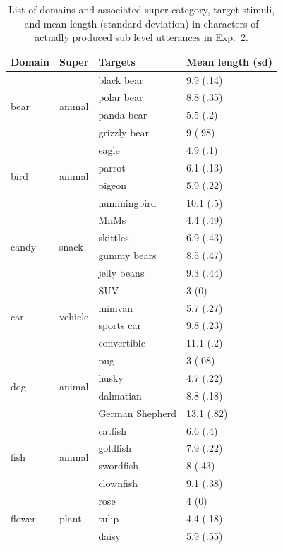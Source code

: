 \documentclass[11pt]{article}
\begin{document}
\begin{table}
\centering
\caption{List of domains and associated super category, target stimuli, and mean length (standard deviation) in characters of actually produced sub level utterances in Exp.~2.}
	\label{tab:reflevelstimuli}
	\begin{tabular}{l l l l}
	\toprule
	Domain & Super & Targets & Mean length (sd)\\
	\midrule
	\multirow{4}{*}{bear} & \multirow{4}{*}{animal} & black bear & 9.9 (.14)\\
	& & polar bear & 8.8 (.35)\\
	& & panda bear & 5.5 (.2)\\
	& & grizzly bear & 9 (.98)\\
	\midrule
	\multirow{4}{*}{bird} & \multirow{4}{*}{animal} & eagle & 4.9 (.1)\\
	& 	& parrot & 6.1 (.13)\\
	& & pigeon & 5.9 (.22)\\
	& 	& hummingbird & 10.1 (.5)\\
	\midrule
	\multirow{4}{*}{candy} & \multirow{4}{*}{snack} & MnMs & 4.4 (.49)\\
		& & skittles & 6.9 (.43)\\
		& & gummy bears & 8.5 (.47)\\
		& & jelly beans & 9.3 (.44)\\
	\midrule
	\multirow{4}{*}{car} & \multirow{4}{*}{vehicle} & SUV & 3 (0)\\
		& & minivan & 5.7 (.27)\\
		& & sports car & 9.8 (.23)\\
		& & convertible & 11.1 (.2)\\
	\midrule
	\multirow{4}{*}{dog} & \multirow{4}{*}{animal} & pug & 3 (.08)\\
		& & husky & 4.7 (.22)\\
		& & dalmatian & 8.8 (.18)\\
		& & German Shepherd & 13.1 (.82)\\
	\midrule
	\multirow{4}{*}{fish} & \multirow{4}{*}{animal} & catfish & 6.6 (.4)\\
		& & goldfish & 7.9 (.22)\\
		& & swordfish & 8 (.43)\\
		& & clownfish & 9.1 (.38)\\
	\midrule
	\multirow{4}{*}{flower} & \multirow{4}{*}{plant} & rose & 4 (0)\\
		& & tulip & 4.4 (.18)\\
		& & daisy & 5.9 (.55)\\

\end{tabular}
\end{table}
\end{document}
